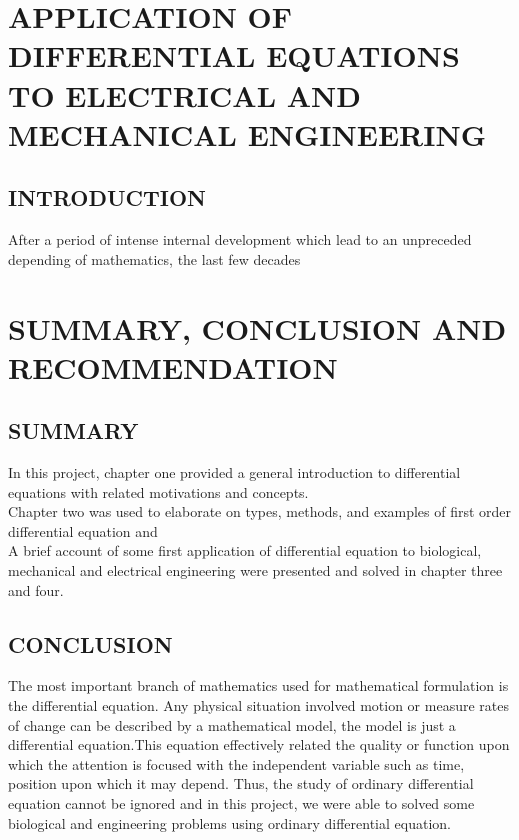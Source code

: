 \documentclass[11pt]{report}
\newcommand{\NI}{\noindent}
\begin{document}
	
	\chapter{APPLICATION OF DIFFERENTIAL EQUATIONS TO ELECTRICAL AND MECHANICAL ENGINEERING}
	\section{INTRODUCTION}
	After a period of intense internal development which lead to an unpreceded depending of mathematics, the last few decades 

	\chapter{SUMMARY, CONCLUSION AND RECOMMENDATION}
	\section{SUMMARY}
	In this project, chapter one provided a general introduction to differential equations with related motivations and concepts.\\
	
	\NI Chapter two was used to elaborate on types, methods, and examples of first order differential equation and\\
	
	\NI A brief account of some first application of differential equation to biological, mechanical and electrical engineering were presented and solved in chapter three and four.
	
	
	\section{CONCLUSION}
	The most important branch of mathematics used for mathematical formulation is the differential equation.  Any physical situation involved motion or measure rates of change can be described by a mathematical model, the model is just a differential equation.This equation effectively related the quality or function upon which the attention is focused with the independent variable such as time, position upon which it may depend. Thus, the study of ordinary differential equation cannot be ignored and in this project, we were able to solved some biological and engineering problems using ordinary differential equation.\\
	
\end{document}
